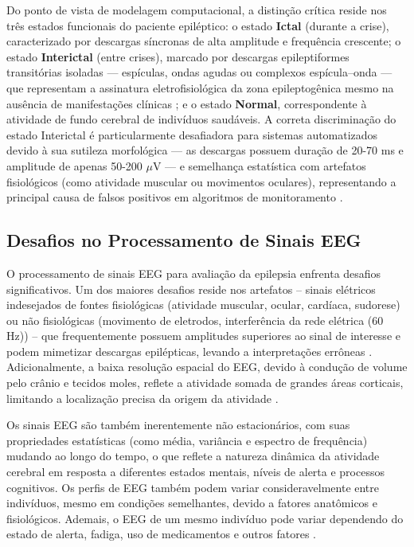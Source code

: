\documentclass[alpha-refs,brazilian]{CC-EC_TF-TC}
\begin{document}
Do ponto de vista de modelagem computacional, a distinção crítica reside nos três estados funcionais do paciente epiléptico: o estado \textbf{Ictal} (durante a crise), caracterizado por descargas síncronas de alta amplitude e frequência crescente; o estado \textbf{Interictal} (entre crises), marcado por descargas epileptiformes transitórias isoladas — espículas, ondas agudas ou complexos espícula--onda — que representam a assinatura eletrofisiológica da zona epileptogênica mesmo na ausência de manifestações clínicas \citep{Noachtar2021}; e o estado \textbf{Normal}, correspondente à atividade de fundo cerebral de indivíduos saudáveis. A correta discriminação do estado Interictal é particularmente desafiadora para sistemas automatizados devido à sua sutileza morfológica — as descargas possuem duração de 20-70 ms e amplitude de apenas 50-200 $\mu$V — e semelhança estatística com artefatos fisiológicos (como atividade muscular ou movimentos oculares), representando a principal causa de falsos positivos em algoritmos de monitoramento \citep{Noachtar2021, Schomer2018}.

\subsection{Desafios no Processamento de Sinais EEG}

O processamento de sinais EEG para avaliação da epilepsia enfrenta desafios significativos. Um dos maiores desafios reside nos artefatos – sinais elétricos indesejados de fontes fisiológicas (atividade muscular, ocular, cardíaca, sudorese) ou não fisiológicas (movimento de eletrodos, interferência da rede elétrica (60 Hz)) – que frequentemente possuem amplitudes superiores ao sinal de interesse e podem mimetizar descargas epilépticas, levando a interpretações errôneas \citep{Subasi2019, Pillai2007, Islam2018}. Adicionalmente, a baixa resolução espacial do EEG, devido à condução de volume pelo crânio e tecidos moles, reflete a atividade somada de grandes áreas corticais, limitando a localização precisa da origem da atividade \citep{Schomer2018}.

Os sinais EEG são também inerentemente não estacionários, com suas propriedades estatísticas (como média, variância e espectro de frequência) mudando ao longo do tempo, o que reflete a natureza dinâmica da atividade cerebral em resposta a diferentes estados mentais, níveis de alerta e processos cognitivos. Os perfis de EEG também podem variar consideravelmente entre indivíduos, mesmo em condições semelhantes, devido a fatores anatômicos e fisiológicos. Ademais, o EEG de um mesmo indivíduo pode variar dependendo do estado de alerta, fadiga, uso de medicamentos e outros fatores \citep{Schomer2018}.
\end{document}
